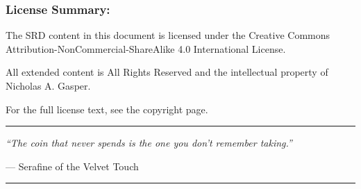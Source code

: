 \documentclass[10pt]{article}
\begin{document}
\subsubsection*{License Summary:}

The SRD content in this document is licensed under the Creative Commons Attribution-NonCommercial-ShareAlike 4.0 International License.

All extended content is All Rights Reserved and the intellectual property of Nicholas A. Gasper.

For the full license text, see the copyright page.

\vspace{0.5cm}

\begin{center}
\rule{0.4\textwidth}{0.5pt}

\textit{``The coin that never spends is the one you don't remember taking.''}

--- Serafine of the Velvet Touch

\rule{0.4\textwidth}{0.5pt}
\end{center}


\end{document}
